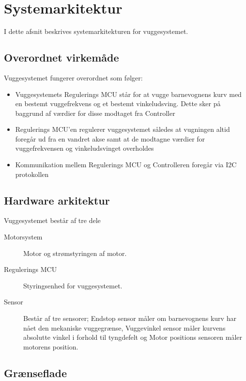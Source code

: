 \section{Systemarkitektur}

I dette afsnit beskrives systemarkitekturen for vuggesystemet.

\subsection*{Overordnet virkemåde}

Vuggesystemet fungerer overordnet som følger:
\begin{itemize}
	\item Vuggesystemets Regulerings MCU står for at vugge barnevognens kurv med en bestemt vuggefrekvens og et bestemt vinkeludsving. Dette sker på baggrund af værdier for disse modtaget fra Controller
	\item Regulerings MCU'en regulerer vuggesystemet således at vugningen altid foregår ud fra en vandret akse samt at de modtagne værdier for vuggefrekvensen og vinkeludsvinget overholdes  
	\item Kommunikation mellem Regulerings MCU og Controlleren foregår via I2C protokollen
\end{itemize}

\subsection{Hardware arkitektur}


Vuggesystemet består af tre dele
\begin{description}
\item[Motorsystem] Motor og strømstyringen af motor. 
\item[Regulerings MCU] Styringsenhed for vuggesystemet.
\item[Sensor] Består af tre sensorer; Endstop sensor måler om barnevognens kurv har nået den mekaniske vuggegrænse, Vuggevinkel sensor måler kurvens absolutte vinkel i forhold til tyngdefelt og Motor positions sensoren måler motorens position.
\end{description}

\subsection*{Grænseflade}